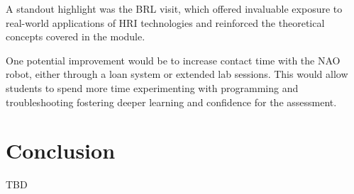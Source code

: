 \documentclass[conference]{IEEEtran}
\begin{document}
A standout highlight was the BRL visit, which offered invaluable exposure to real-world applications of HRI technologies and reinforced the theoretical concepts covered in the module.

One potential improvement would be to increase contact time with the NAO robot, either through a loan system or extended lab sessions. This would allow students to spend more time experimenting with programming and troubleshooting fostering deeper learning and confidence for the assessment.



\section{Conclusion}

TBD



\end{document}
